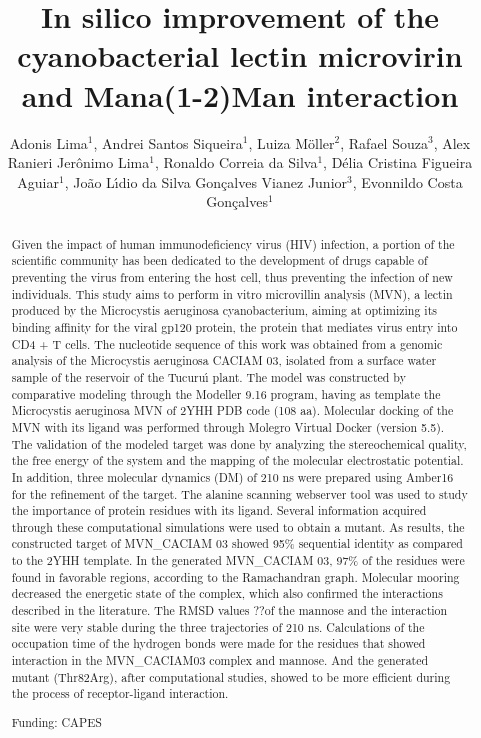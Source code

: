\documentclass[twoside]{article}
\title{\vspace{-15mm}\fontsize{24pt}{10pt}\selectfont\textbf{In silico improvement of the cyanobacterial lectin microvirin and Mana(1-2)Man interaction}} %
\author{Adonis Lima$^1$, Andrei Santos Siqueira$^1$, Luiza M\"oller$^2$, Rafael Souza$^3$, Alex Ranieri Jer\^onimo Lima$^1$, Ronaldo Correia da Silva$^1$, D\'elia Cristina Figueira Aguiar$^1$, Jo\~ao L\'{\i}dio da Silva Gon\c{c}alves Vianez Junior$^3$, Evonnildo Costa Gon\c{c}alves$^1$}
\affil{1 UNIVERSIDADE FEDERAL DO PAR\'A\\ 2 FACULDADE INTEGRADA BRASIL AMAZ\^ONIA\\ 3 INSTITUTO EVANDRO CHAGAS\\ }
\date{}
\begin{document}
\maketitle %

\thispagestyle{fancy} %


\begin{abstract}
Given the impact of human immunodeficiency virus (HIV) infection, a portion of the scientific community has been dedicated to the development of drugs capable of preventing the virus from entering the host cell, thus preventing the infection of new individuals. This study aims to perform in vitro microvillin analysis (MVN), a lectin produced by the Microcystis aeruginosa cyanobacterium, aiming at optimizing its binding affinity for the viral gp120 protein, the protein that mediates virus entry into CD4 + T cells. The nucleotide sequence of this work was obtained from a genomic analysis of the Microcystis aeruginosa CACIAM 03, isolated from a surface water sample of the reservoir of the Tucuru\'{\i} plant. The model was constructed by comparative modeling through the Modeller 9.16 program, having as template the Microcystis aeruginosa MVN of 2YHH PDB code (108 aa). Molecular docking of the MVN with its ligand was performed through Molegro Virtual Docker (version 5.5). The validation of the modeled target was done by analyzing the stereochemical quality, the free energy of the system and the mapping of the molecular electrostatic potential. In addition, three molecular dynamics (DM) of 210 ns were prepared using Amber16 for the refinement of the target. The alanine scanning webserver tool was used to study the importance of protein residues with its ligand. Several information acquired through these computational simulations were used to obtain a mutant. As results, the constructed target of MVN\_CACIAM 03 showed 95\% sequential identity as compared to the 2YHH template. In the generated MVN\_CACIAM 03, 97\% of the residues were found in favorable regions, according to the Ramachandran graph. Molecular mooring decreased the energetic state of the complex, which also confirmed the interactions described in the literature. The RMSD values ??of the mannose and the interaction site were very stable during the three trajectories of 210 ns. Calculations of the occupation time of the hydrogen bonds were made for the residues that showed interaction in the MVN\_CACIAM03 complex and mannose. And the generated mutant (Thr82Arg), after computational studies, showed to be more efficient during the process of receptor-ligand interaction.

Funding: CAPES
\end{abstract}
\end{document}
